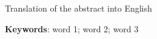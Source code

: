 
\begin{resumo}[Abstract]%

    \begin{otherlanguage}{english}
        
        Translation of the abstract into English
    
        \noindent
        \textbf{Keywords}: word 1; word 2; word 3
    
    \end{otherlanguage}

\end{resumo}
    